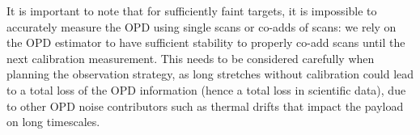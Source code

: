 It is important to note that for sufficiently faint targets, it is impossible to accurately measure the OPD using single scans or co-adds of scans: we rely on the OPD estimator to have sufficient stability to properly co-add scans until the next calibration measurement. This needs to be considered carefully when planning the observation strategy, as long stretches without calibration could lead to a total loss of the OPD information (hence a total loss in scientific data), due to other OPD noise contributors such as thermal drifts that impact the payload on long timescales.




